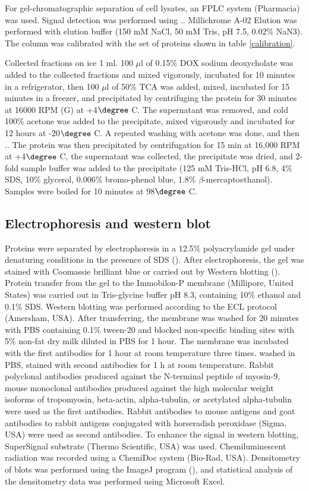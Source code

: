 \documentclass[english,authoryear]{elsarticle}
\begin{document}
For gel-chromatographic separation of cell lysates, an FPLC system (Pharmacia) was used.
Signal detection was performed using .. Millichrome A-02
Elution was performed with elution buffer (150 mM NaCl, 50 mM Tris, pH 7.5, 0.02\% NaN3).
The column was calibrated with the set of proteins shown in table \ref{calibration}.


Collected fractions on ice 1 ml.
100 $\mu$l of 0.15\% DOX sodium deoxycholate was added to the collected fractions and mixed vigorously, incubated for 10 minutes in a refrigerator, then 100 $\mu$l of 50\% TCA was added, mixed, incubated for 15 minutes in a freezer, and precipitated by centrifuging the protein for 30 minutes at 16000 RPM (G) at +4$\degree$ C.
The supernatant was removed, and cold 100\% acetone was added to the precipitate, mixed vigorously and incubated for 12 hours at -20$\degree$ C. A repeated washing with acetone was done, and then ..
The protein was then precipitated by centrifugation for 15 min at 16,000 RPM at +4$\degree$ C, the supernatant was collected, the precipitate was dried, and 2-fold sample buffer was added to the precipitate (125 mM Tris-HCl, pH 6.8, 4\% SDS, 10\% glycerol, 0.006\% bromo-phenol blue, 1.8\% $\beta$-mercaptoethanol).
Samples were boiled for 10 minutes at 98$\degree$ C.

\subsection{Electrophoresis and western blot}

Proteins were separated by electrophoresis in a 12.5\%  polyacrylamide gel under denaturing conditions in the presence of SDS (\cite{laemmli1970cleavage}).
After electrophoresis, the gel was stained with Coomassie brilliant blue or carried out by Western blotting (\cite{towbin1979electrophoretic}).
Protein transfer from the gel to the Immobilon-P membrane (Millipore, United States) was carried out in Tris-glycine buffer pH 8.3, containing 10\% ethanol and 0.1\% SDS.
Western blotting was performed according to the ECL protocol (Amersham, USA).
After transferring, the membrane was washed for 20 minutes with PBS containing 0.1\% tween-20 and blocked non-specific binding sites with 5\% non-fat dry milk diluted in PBS for 1 hour.
The membrane was incubated with the first antibodies for 1 hour at room temperature three times. washed in PBS, stained with second antibodies for 1 h at room temperature. Rabbit polyclonal antibodies produced against the N-terminal peptide of myosin-9, mouse monoclonal antibodies produced against the high molecular weight isoforms of tropomyosin, beta-actin, alpha-tubulin, or acetylated alpha-tubulin were used as the first antibodies.
Rabbit antibodies to mouse antigens and goat antibodies to rabbit antigens conjugated with horseradish peroxidase (Sigma, USA) were used as second antibodies.
To enhance the signal in western blotting, SuperSignal substrate (Thermo Scientific, USA) was used.
Chemiluminescent radiation was recorded using a ChemiDoc system (Bio-Rad, USA).
Densitometry of blots was performed using the ImageJ program (\cite{rueden2017imagej2}), and statistical analysis of the densitometry data was performed using Microsoft Excel.
\end{document}
